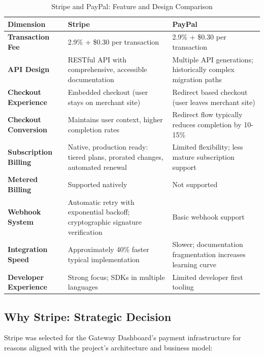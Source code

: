 \begin{table}[H]
\centering
\caption{Stripe and PayPal: Feature and Design Comparison}
\label{tab:payment_comparison}
\begin{tabular}{|p{3.2cm}|p{4.8cm}|p{4.8cm}|}
\hline
\textbf{Dimension} & \textbf{Stripe} & \textbf{PayPal} \\ \hline
\textbf{Transaction Fee} & 2.9\% + \$0.30 per transaction & 2.9\% + \$0.30 per transaction \\ \hline
\textbf{API Design} & RESTful API with comprehensive, accessible documentation \cite{stripe2023docs} & Multiple API generations; historically complex migration paths \\ \hline
\textbf{Checkout Experience} & Embedded checkout (user stays on merchant site) & Redirect based checkout (user leaves merchant site) \\ \hline
\textbf{Checkout Conversion} & Maintains user context, higher completion rates & Redirect flow typically reduces completion by 10-15\% \cite{baymard2020checkout} \\ \hline
\textbf{Subscription Billing} & Native, production ready: tiered plans, prorated changes, automated renewal \cite{stripe2023billing} & Limited flexibility; less mature subscription support \\ \hline
\textbf{Metered Billing} & Supported natively & Not supported \\ \hline
\textbf{Webhook System} & Automatic retry with exponential backoff; cryptographic signature verification \cite{sohan2017webhook} & Basic webhook support \\ \hline
\textbf{Integration Speed} & Approximately 40\% faster typical implementation \cite{herzberg2019payment} & Slower; documentation fragmentation increases learning curve \\ \hline
\textbf{Developer Experience} & Strong focus; SDKs in multiple languages & Limited developer first tooling \\ \hline
\end{tabular}
\end{table}

\subsection{Why Stripe: Strategic Decision}

Stripe was selected for the Gateway Dashboard's payment infrastructure for reasons aligned with the project's architecture and business model:

